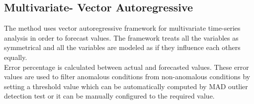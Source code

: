 \subsection{Multivariate- Vector Autoregressive}
The method uses vector autoregressive framework for multivariate time-series analysis in order to forecast values. The framework treats all the variables as symmetrical and all the variables are modeled as if they influence each others equally.
\\
Error percentage is calculated between actual and forecasted values. These error values are used to filter anomalous conditions from non-anomalous conditions by setting a threshold value which can be automatically computed by MAD outlier detection test or it can be manually configured to the required value.